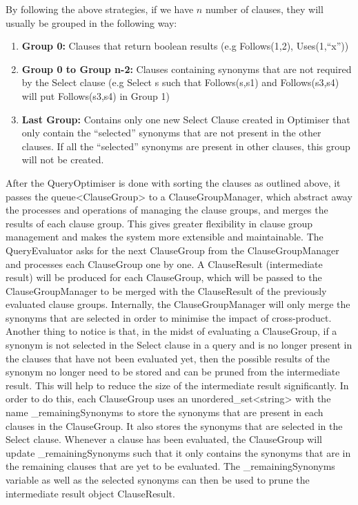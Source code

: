 \documentclass[12pt]{article}
\begin{document}
{{{{{{{{{{{{{By following the above strategies, if we have $n$ number of clauses, they will usually be grouped in the following way:
\begin{enumerate}
\item \textbf{Group 0:} Clauses that return boolean results (e.g Follows(1,2), Uses(1,“x”)) 
\item \textbf{Group 0 to Group n-2:} Clauses containing synonyms that are not required by the Select clause (e.g Select s such that Follows(s,s1) and Follows(s3,s4) will put Follows(s3,s4) in Group 1)
\item \textbf{Last Group:} Contains only one new Select Clause created in Optimiser that only contain the “selected” synonyms that are not present in the other clauses. If all the “selected” synonyms are present in other clauses, this group will not be created.
\end{enumerate}
\vspace{3mm}
After the QueryOptimiser is done with sorting the clauses as outlined above, it passes the queue<ClauseGroup> to a ClauseGroupManager, which abstract away the processes and operations of managing the clause groups, and merges the results of each clause group. This gives greater flexibility in clause group management and makes the system more extensible and maintainable. The QueryEvaluator asks for the next ClauseGroup from the ClauseGroupManager and processes each ClauseGroup one by one. A ClauseResult (intermediate result) will be produced for each ClauseGroup, which will be passed to the ClauseGroupManager to be merged with the ClauseResult of the previously evaluated clause groups. Internally, the ClauseGroupManager will only merge the synonyms that are selected in order to minimise the impact of cross-product.
\newline
Another thing to notice is that, in the midst of evaluating a ClauseGroup, if a synonym is not selected in the Select clause in a query and is no longer present in the clauses that have not been evaluated yet, then the possible results of the synonym no longer need to be stored and can be pruned from the intermediate result. This will help to reduce the size of the intermediate result significantly. In order to do this, each ClauseGroup uses an unordered\_set<string> with the name \_remainingSynonyms to store the synonyms that are present in each clauses in the ClauseGroup. It also stores the synonyms that are selected in the Select clause. Whenever a clause has been evaluated, the ClauseGroup will update \_remainingSynonyms such that it only contains the synonyms that are in the remaining clauses that are yet to be evaluated. The \_remainingSynonyms variable as well as the selected synonyms can then be used to prune the intermediate result object ClauseResult.

}}}}}}}}}}}}}
\end{document}
